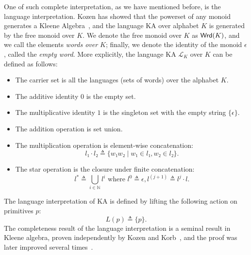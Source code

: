 One of such complete interpretation, as we have mentioned before, is the language interpretation.
Kozen has showed that the powerset of any monoid generates a Kleene Algebra~\cite{Kozen_2002},
and the language KA over alphabet \(K\) is generated by the free monoid over \(K\).
We denote the free monoid over \(K\) as \(\mathsf{Wrd}(K)\), 
and we call the elements \emph{words over \(K\)};
finally, we denote the identity of the monoid \(ϵ\), called the \emph{empty word}.
More explicitly, the language KA \(ℒ_{K}\) over \(K\) can be defined as follows:
\begin{itemize}[nosep]
  \item The carrier set is all the languages (sets of words) over the alphabet \(K\).
  \item The additive identity \(0\) is the empty set. 
  \item The multiplicative identity \(1\) is the singleton set with the empty string \(\{ϵ\}\).
  \item The addition operation is set union.
  \item The multiplication operation is element-wise concatenation:
    \[l₁ ⋅ l₂ ≜ \{w₁ w₂ ∣ w₁ ∈ l₁, w₂ ∈ l₂\}.\]
  \item The star operation is the closure under finite concatenation:
    \[l^* ≜ ⋃_{i ∈ ℕ} l^{i} \text{ where } l^0 ≜ ϵ, l^{(j + 1)} ≜ l^{j} ⋅ l.\]
\end{itemize}
The language interpretation of KA is defined by lifting the following action on primitives \(p\):
\[L(p) ≜ \{p\}.\]
The completeness result of the language interpretation is a seminal result in Kleene algebra,
proven independently by Kozen and Korb~\cite{Kozen_1994,Krob_1991}, 
and the proof was later improved several times~\cite{Kozen_2001,Silva_2010,Kozen_Silva_2020}.


